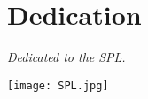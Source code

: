 \chapter{Dedication}

\begin{center}
\textit{Dedicated to the SPL.}

\hfill

\texttt{[image: SPL.jpg]}
\end{center}
